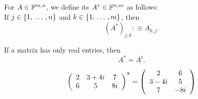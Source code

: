 \begin{mydef}
  For $A \in \mathbb{F}^{m,n}$, we define its  $A^* \in \mathbb{F}^{n,m}$ as follows:\\
  If $j \in \{1, {\, \ldots \,\,}, n\}$ and $k \in \{1, {\, \ldots \,\,}, m\}$, then
  \[
    (A^*)_{j,k} :\equiv \overline{A_{k,j}}.
  \]

  If a matrix has only real entries, then
  \[
    A^* = A^t.
  \]
\end{mydef}

\begin{example}
  \[
    \left(
      \begin{array}{ccc}
      2   & 3+4i  & 7   \\
      6   & 5     & 8i  \\
      \end{array}
    \right)^{\mathlarger{*}}
    =
    \left(
      \begin{array}{cc}
        2     & 6   \\
        3-4i  & 5   \\
        7     & -8i
      \end{array}
    \right)
  \]
\end{example}

